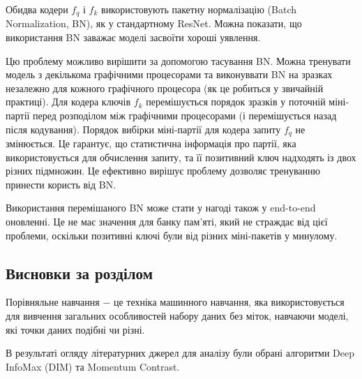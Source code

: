 Обидва кодери $f_{q}$ і $f_{k}$ використовують пакетну нормалізацію (Batch Normalization, BN), як у стандартному ResNet. Можна показати, що використання BN заважає моделі засвоїти хороші уявлення.

Цю проблему можливо вирішити за допомогою тасування BN. Можна тренувати модель з декількома графічними процесорами та виконуввати BN на зразках незалежно для кожного графічного процесора (як це робиться у звичайній практиці). Для кодера ключів $f_{k}$ перемішується порядок зразків у поточній міні-партії перед розподілом між графічними процесорами (і перемішується назад після кодування). Порядок вибірки міні-партії для кодера запиту $f_{q}$ не змінюється. Це гарантує, що статистична інформація про партії, яка використовується для обчислення запиту, та її позитивний ключ надходять із двох різних підмножин. Це ефективно вирішує проблему дозволяє тренуванню принести користь від BN.

Використання перемішаного BN може стати у нагоді також у end-to-end оновленні. Це не має значення для банку пам'яті, який не страждає від цієї проблеми, оскільки позитивні ключі були від різних міні-пакетів у минулому.

\subsection{Висновки за розділом}

Порівняльне навчання $-$ це техніка машинного навчання, яка використовується для вивчення загальних особливостей набору даних без міток, навчаючи моделі, які точки даних подібні чи різні.

В результаті огляду літературних джерел для аналізу були обрані алгоритми Deep InfoMax (DIM) та Momentum Contrast.

